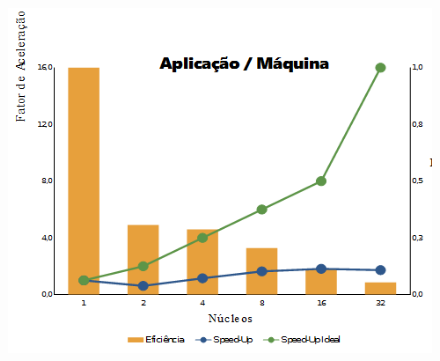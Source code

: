 \documentclass{acm_proc_article-sp}
\begin{document}
\begin{figure}[h]
\includegraphics[scale=0.65]{table.png}
\end{figure}







%

%

\end{document}
